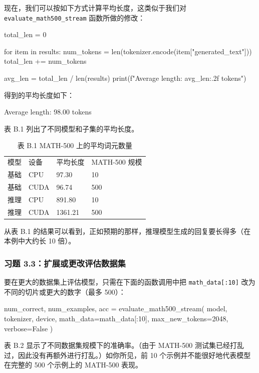 现在，我们可以按如下方式计算平均长度，这类似于我们对 \texttt{evaluate\_math500\_stream} 函数所做的修改：

\begin{codebox}
total_len = 0

for item in results:
    num_tokens = len(tokenizer.encode(item["generated_text"]))
    total_len += num_tokens

avg_len = total_len / len(results)
print(f"Average length: {avg_len:.2f} tokens")
\end{codebox}

得到的平均长度如下：

\begin{codebox}
Average length: 98.00 tokens
\end{codebox}

表 B.1 列出了不同模型和子集的平均长度。

\begin{table}[htbp]
\centering\small
\centering
\caption{表 B.1 MATH-500 上的平均词元数量}
\begin{tabularx}{\linewidth}{XXXX}
\toprule
模型 & 设备 & 平均长度 & MATH-500 规模 \\
基础 & CPU & 97.30 & 10 \\
基础 & CUDA & 96.74 & 500 \\
推理 & CPU & 891.80 & 10 \\
推理 & CUDA & 1361.21 & 500 \\ \bottomrule
\end{tabularx}
\end{table}

从表 B.1 的结果可以看到，正如预期的那样，推理模型生成的回复要长得多（在本例中大约长 10 倍）。

\subsubsection*{习题 3.3：扩展或更改评估数据集}

要在更大的数据集上评估模型，只需在下面的函数调用中把 \texttt{math\_data[:10]} 改为不同的切片或更大的数字（最多 500）：

\begin{codebox}
num_correct, num_examples, acc = evaluate_math500_stream(
    model, tokenizer, device,
    math_data=math_data[:10],
    max_new_tokens=2048,
    verbose=False
)
\end{codebox}

表 B.2 显示了不同数据集规模下的准确率。（由于 MATH-500 测试集已经打乱过，因此没有再额外进行打乱。）如你所见，前 10 个示例并不能很好地代表模型在完整的 500 个示例上的 MATH-500 表现。

